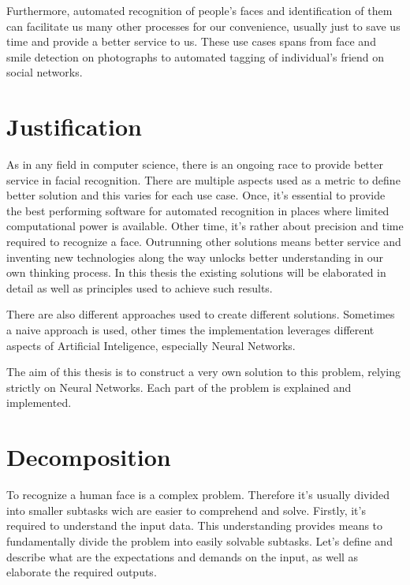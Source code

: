 Furthermore, automated recognition of people's faces and identification of them can facilitate us many other processes for our convenience, usually just to save us time and provide a better service to us. These use cases spans from face and smile detection on photographs to automated tagging of individual's friend on social networks.

\section{Justification}

As in any field in computer science, there is an ongoing race to provide better service in facial recognition. There are multiple aspects used as a metric to define better solution and this varies for each use case. Once, it's essential to provide the best performing software for automated recognition in places where limited computational power is available. Other time, it's rather about precision and time required to recognize a face. Outrunning other solutions means better service and inventing new technologies along the way unlocks better understanding in our own thinking process. In this thesis the existing solutions will be elaborated in detail as well as principles used to achieve such results.

There are also different approaches used to create different solutions. Sometimes a naive approach is used, other times the implementation leverages different aspects of Artificial Inteligence, especially Neural Networks.

The aim of this thesis is to construct a very own solution to this problem, relying strictly on Neural Networks. Each part of the problem is explained and implemented. %


\section{Decomposition}

To recognize a human face is a complex problem. Therefore it's usually divided into smaller subtasks wich are easier to comprehend and solve. Firstly, it's required to understand the input data. This understanding provides means to fundamentally divide the problem into easily solvable subtasks. Let's define and describe what are the expectations and demands on the input, as well as elaborate the required outputs.

